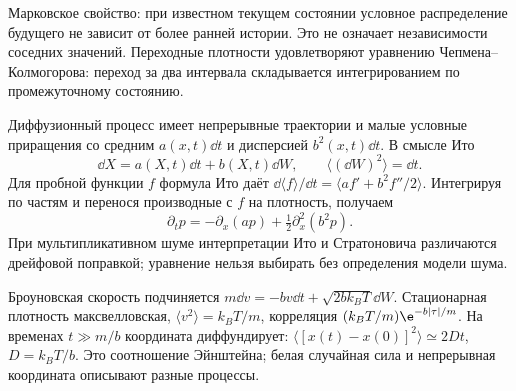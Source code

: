 
Марковское свойство: при известном текущем состоянии условное распределение будущего не зависит от более ранней истории. Это не означает независимости соседних значений. Переходные плотности удовлетворяют уравнению Чепмена–Колмогорова: переход за два интервала складывается интегрированием по промежуточному состоянию.

Диффузионный процесс имеет непрерывные траектории и малые условные приращения со средним $a(x,t)\dd t$ и дисперсией $b^2(x,t)\dd t$. В смысле Ито
\begin{equation}
 \dd X=a(X,t)\dd t+b(X,t)\dd W,\qquad \langle(\dd W)^2\rangle=\dd t.
\end{equation}
Для пробной функции $f$ формула Ито даёт $\dd\langle f\rangle/\dd t=\langle af'+b^2f''/2\rangle$. Интегрируя по частям и перенося производные с $f$ на плотность, получаем
\begin{equation}\label{eq:fokkerplanck}
 \partial_tp=-\partial_x(ap)+\tfrac12\partial_x^2(b^2p).
\end{equation}
При мультипликативном шуме интерпретации Ито и Стратоновича различаются дрейфовой поправкой; уравнение нельзя выбирать без определения модели шума.

Броуновская скорость подчиняется $m\dd v=-bv\dd t+\sqrt{2bk_BT}\dd W$. Стационарная плотность максвелловская, $\langle v^2\rangle=k_BT/m$, корреляция $(k_BT/m)\e^{-b|\tau|/m}$. На временах $t\gg m/b$ координата диффундирует: $\langle[x(t)-x(0)]^2\rangle\simeq2Dt$, $D=k_BT/b$. Это соотношение Эйнштейна; белая случайная сила и непрерывная координата описывают разные процессы.
